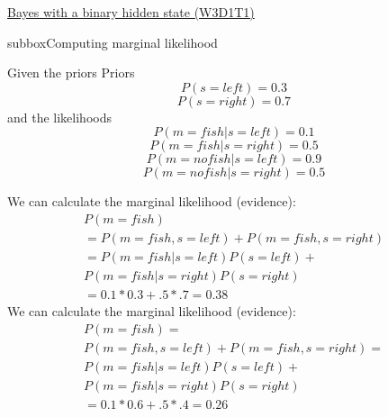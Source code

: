\begin{textbox}{\href{https://compneuro.neuromatch.io/tutorials/W3D1_BayesianDecisions/student/W3D1_Tutorial1.html}{Bayes with a binary hidden state (W3D1T1)} }
\begin{subbox}{subbox}{Computing marginal likelihood}
\scriptsize

Given the priors
Priors
$$P(s = left) = 0.3$$
$$P(s = right) = 0.7$$
and the likelihoods
$$P(m = fish | s = left) = 0.1$$
$$P(m = fish | s = right) = 0.5$$
$$P(m = no fish | s = left) = 0.9$$
$$P(m = no fish | s = right) = 0.5$$

We can calculate the marginal likelihood (evidence):
 \begin{eqnarray*}   P(m = fish)\\ 
 = P(m = fish, s = left) + P(m = fish, s = right)\\
                = P(m = fish | s = left)P(s = left) +\\ P(m = fish | s = right)P(s = right)\\
                = 0.1 * 0.3 + .5 * .7
            = 0.38
            \end{eqnarray*}
We can calculate the marginal likelihood (evidence): 
  \begin{eqnarray*}    P(m = fish) =\\ P(m = fish, s = left) + P(m = fish, s = right)
                =\\ P(m = fish | s = left)P(s = left) + \\P(m = fish | s = right)P(s = right)\\
                = 0.1 * 0.6 + .5 * .4
                = 0.26
                 \end{eqnarray*} 
\end{subbox}

\end{textbox}
